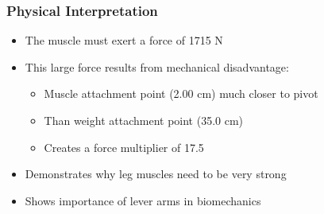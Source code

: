 \documentclass{beamer}
\begin{document}
\begin{frame}
\frametitle{Physical Interpretation}
\begin{itemize}
    \item The muscle must exert a force of 1715 N 
    \item This large force results from mechanical disadvantage:
    \begin{itemize}
        \item Muscle attachment point (2.00 cm) much closer to pivot
        \item Than weight attachment point (35.0 cm)
        \item Creates a force multiplier of 17.5
    \end{itemize}
    \item Demonstrates why leg muscles need to be very strong
    \item Shows importance of lever arms in biomechanics
\end{itemize}
\end{frame}
\end{document}
